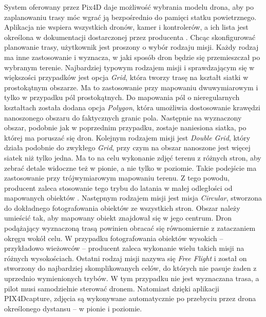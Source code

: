 System oferowany przez Pix4D daje możliwość wybrania modelu drona, aby po zaplanowaniu trasy móc wgrać ją bezpośrednio do pamięci statku powietrznego. Aplikacja nie wspiera wszystkich dronów, kamer i kontrolerów, a ich lista jest określona w dokumentacji dostarczonej przez producenta \cite{pix4dcapture_supported}. Chcąc skonfigurować planowanie trasy, użytkownik jest proszony o wybór rodzaju misji. Każdy rodzaj ma inne zastosowanie i wyznacza, w jaki sposób dron będzie się przemieszczał po wybranym terenie. Najbardziej typowym rodzajem misji i sprawdzającym się w większości przypadków jest opcja \textit{Grid}, która tworzy trasę na kształt siatki w prostokątnym obszarze. Ma to zastosowanie przy mapowaniu dwuwymiarowym i tylko w przypadku pól prostokątnych. Do mapowania pól o nieregularnych kształtach została dodana opcja \textit{Polygon}, która umożliwia dostosowanie krawędzi nanoszonego obszaru do faktycznych granic pola. Następnie na wyznaczony obszar, podobnie jak w poprzednim przypadku, zostaje naniesiona siatka, po której ma poruszać się dron. Kolejnym rodzajem misji jest \textit{Double Grid}, który działa podobnie do zwykłego \textit{Grid}, przy czym na obszar nanoszone jest więcej siatek niż tylko jedna. Ma to na celu wykonanie zdjęć terenu z różnych stron, aby zebrać detale widoczne też w pionie, a nie tylko w poziomie. Takie podejście ma zastosowanie przy trójwymiarowym mapowaniu terenu. Z tego powodu, producent zaleca stosowanie tego trybu do latania w małej odległości od mapowanych obiektów \cite{pix4d_missions}. Następnym rodzajem misji jest misja \textit{Circular}, stworzona do dokładnego fotografowania obiektów ze wszystkich stron. Obszar należy umieścić tak, aby mapowany obiekt znajdował się w jego centrum. Dron podążający wyznaczoną trasą powinien obracać się równomiernie z zataczaniem okręgu wokół celu. W przypadku fotografowania obiektów wysokich – przykładowo wieżowców – producent zaleca wykonanie wielu takich misji na różnych wysokościach. Ostatni rodzaj misji nazywa się \textit{Free Flight} i został on stworzony do najbardziej skomplikowanych celów, do których nie pasuje żaden z uprzednio wymienionych trybów. W tym przypadku nie jest wyznaczana trasa, a pilot musi samodzielnie sterować dronem. Natomiast dzięki aplikacji PIX4Dcapture, zdjęcia są wykonywane automatycznie po przebyciu przez drona określonego dystansu – w pionie i poziomie.

